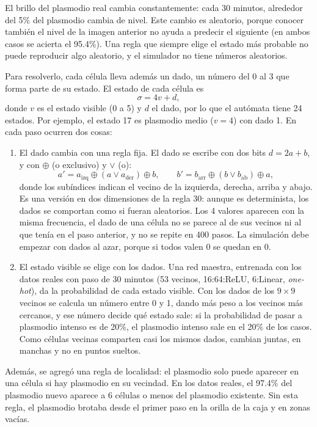 El brillo del plasmodio real cambia constantemente: cada 30 minutos, alrededor del 5\% del plasmodio cambia de nivel. Este cambio es aleatorio, porque conocer también el nivel de la imagen anterior no ayuda a predecir el siguiente (en ambos casos se acierta el 95.4\%). Una regla que siempre elige el estado más probable no puede reproducir algo aleatorio, y el simulador no tiene números aleatorios.

Para resolverlo, cada célula lleva además un dado, un número del 0 al 3 que forma parte de su estado. El estado de cada célula es
\[
	\sigma = 4v + d,
\]
donde $v$ es el estado visible (0 a 5) y $d$ el dado, por lo que el autómata tiene 24 estados. Por ejemplo, el estado 17 es plasmodio medio ($v = 4$) con dado 1. En cada paso ocurren dos cosas:

\begin{enumerate}
	\item El dado cambia con una regla fija. El dado se escribe con dos bits $d = 2a + b$, y con $\oplus$ (o exclusivo) y $\lor$ (o):
	\[
		a' = a_{\text{izq}} \oplus (a \lor a_{\text{der}}) \oplus b, \qquad b' = b_{\text{arr}} \oplus (b \lor b_{\text{ab}}) \oplus a,
	\]
	donde los subíndices indican el vecino de la izquierda, derecha, arriba y abajo. Es una versión en dos dimensiones de la regla 30: aunque es determinista, los dados se comportan como si fueran aleatorios. Los 4 valores aparecen con la misma frecuencia, el dado de una célula no se parece al de sus vecinos ni al que tenía en el paso anterior, y no se repite en 400 pasos. La simulación debe empezar con dados al azar, porque si todos valen 0 se quedan en 0.

	\item El estado visible se elige con los dados. Una red maestra, entrenada con los datos reales con paso de 30 minutos (53 vecinos, 16:64:ReLU, 6:Linear, \textit{one-hot}), da la probabilidad de cada estado visible. Con los dados de los $9 \times 9$ vecinos se calcula un número entre 0 y 1, dando más peso a los vecinos más cercanos, y ese número decide qué estado sale: si la probabilidad de pasar a plasmodio intenso es de 20\%, el plasmodio intenso sale en el 20\% de los casos. Como células vecinas comparten casi los mismos dados, cambian juntas, en manchas y no en puntos sueltos.
\end{enumerate}

Además, se agregó una regla de localidad: el plasmodio solo puede aparecer en una célula si hay plasmodio en su vecindad. En los datos reales, el 97.4\% del plasmodio nuevo aparece a 6 células o menos del plasmodio existente. Sin esta regla, el plasmodio brotaba desde el primer paso en la orilla de la caja y en zonas vacías.

